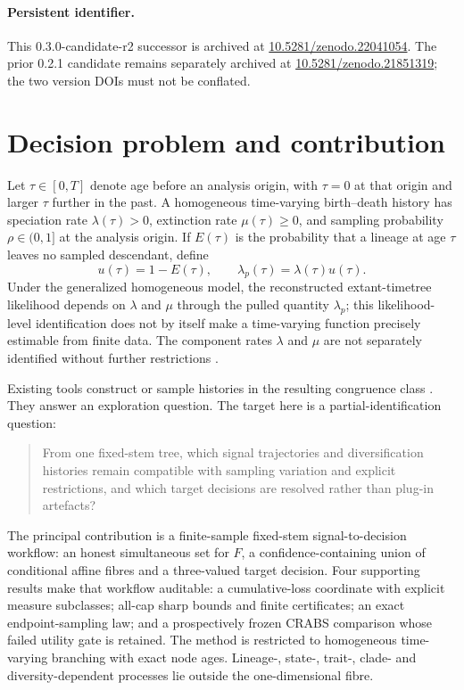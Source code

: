 \documentclass[11pt]{article}
\theoremstyle{definition}
\begin{document}
\paragraph{Persistent identifier.}
This 0.3.0-candidate-r2 successor is archived at \href{https://doi.org/10.5281/zenodo.22041054}{10.5281/zenodo.22041054}. The prior 0.2.1 candidate remains separately archived at \href{https://doi.org/10.5281/zenodo.21851319}{10.5281/zenodo.21851319}; the two version DOIs must not be conflated.

\section{Decision problem and contribution}
Let $\tau\in[0,T]$ denote age before an analysis origin, with $\tau=0$ at that origin and larger $\tau$ further in the past. A homogeneous time-varying birth--death history has speciation rate $\lambda(\tau)>0$, extinction rate $\mu(\tau)\geq0$, and sampling probability $\rho\in(0,1]$ at the analysis origin. If $E(\tau)$ is the probability that a lineage at age $\tau$ leaves no sampled descendant, define
\begin{equation}
 u(\tau)=1-E(\tau),\qquad \lambda_p(\tau)=\lambda(\tau)u(\tau). \label{eq:definitions}
\end{equation}
Under the generalized homogeneous model, the reconstructed extant-timetree likelihood depends on $\lambda$ and $\mu$ through the pulled quantity $\lambda_p$; this likelihood-level identification does not by itself make a time-varying function precisely estimable from finite data. The component rates $\lambda$ and $\mu$ are not separately identified without further restrictions \parencite{louca2020,helmstetter2022,morlon2022,title2026}.

Existing tools construct or sample histories in the resulting congruence class \parencite{hohna2022,andreoletti2023,kopperud2023}. They answer an exploration question. The target here is a partial-identification question:
\begin{quote}
From one fixed-stem tree, which signal trajectories and diversification histories remain compatible with sampling variation and explicit restrictions, and which target decisions are resolved rather than plug-in artefacts?
\end{quote}
The principal contribution is a finite-sample fixed-stem signal-to-decision workflow: an honest simultaneous set for $F$, a confidence-containing union of conditional affine fibres and a three-valued target decision. Four supporting results make that workflow auditable: a cumulative-loss coordinate with explicit measure subclasses; all-cap sharp bounds and finite certificates; an exact endpoint-sampling law; and a prospectively frozen CRABS comparison whose failed utility gate is retained. The method is restricted to homogeneous time-varying branching with exact node ages. Lineage-, state-, trait-, clade- and diversity-dependent processes lie outside the one-dimensional fibre.
\end{document}
